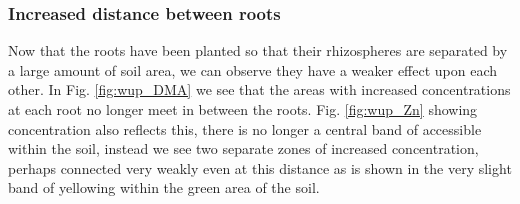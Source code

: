 \documentclass[11pt]{article}
\numberwithin{equation}{section}
\begin{document}
\subsubsection{Increased distance between roots}
 Now that the roots have been planted so that their rhizospheres are separated by a large amount of soil area, we can observe they have a weaker effect upon each other. In Fig. \ref{fig:wup_DMA} we see that the areas with increased  concentrations at each root no longer meet in between the roots. Fig. \ref{fig:wup_Zn} showing  concentration also reflects this, there is no longer a central band of accessible  within the soil, instead we see two separate zones of increased  concentration, perhaps connected very weakly even at this distance as is shown in the very slight band of yellowing within the green area of the soil.
\end{document}
